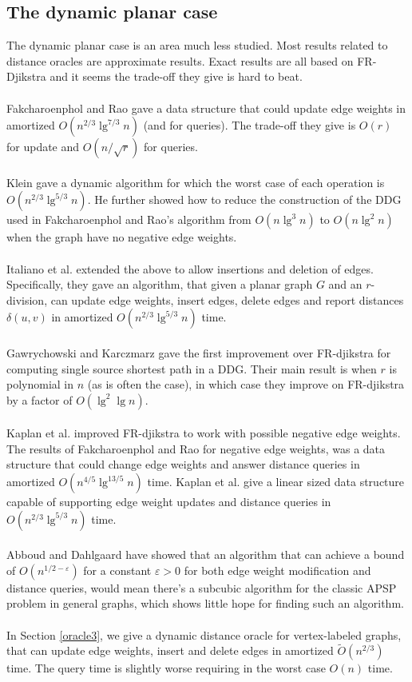 \subsection{The dynamic planar case}
The dynamic planar case is an area much less studied. Most results related to distance
oracles are approximate results. Exact results are all based on FR-Djikstra and it
seems the trade-off they give is hard to beat.\\
\\
Fakcharoenphol and Rao \cite{fakcharoenphol2006planar} gave a data structure that could
update edge weights in amortized $O(n^{2/3}\lg^{7/3} n)$ (and for queries). The trade-off
they give is $O(r)$ for update and $O(n/\sqrt{r})$ for queries. \\
\\
Klein \cite{klein2005multiple} gave a dynamic algorithm for which the worst case of each
operation is $O(n^{2/3}\lg^{5/3} n)$. He further showed how to reduce the construction of
the DDG used in Fakcharoenphol and Rao's algorithm from $O(n\lg^3 n)$ to $O(n\lg^2 n)$
when the graph have no negative edge weights. \\
\\
Italiano et al. \cite{italiano2011improved} extended the above to allow insertions and
deletion of edges. Specifically, they gave an algorithm, that given a planar graph $G$
and an $r$-division,
can update edge weights, insert edges, delete edges and report distances $\delta(u,v)$ in amortized $O(n^{2/3}\lg^{5/3}
n)$ time. \\
\\
Gawrychowski and Karczmarz \cite{gawrychowski2016improved} gave the first improvement
over FR-djikstra for computing single source shortest path in a DDG. Their main result is when $r$ is polynomial in $n$ (as is often the
case), in which case they improve on FR-djikstra by a factor of $O(\lg^2 \lg n)$. \\
\\
Kaplan et al. \cite{kaplan2012submatrix} improved FR-djikstra to work with possible
negative edge weights. The results of Fakcharoenphol and Rao for negative edge weights,
was a data structure that could change edge weights and answer distance queries in
amortized $O(n^{4/5}\lg^{13/5} n)$ time. Kaplan et al. give a linear sized data structure capable of supporting edge
weight updates and distance queries in $O(n^{2/3}\lg^{5/3} n)$ time. \\
\\
Abboud and Dahlgaard \cite{abboud2016popular} have showed that an algorithm that can
achieve a bound of $O(n^{1/2-\varepsilon})$ for a constant $\varepsilon>0$ for both edge
weight modification and distance queries, would mean
there's a subcubic algorithm for the classic APSP problem in general graphs, which shows
little hope for finding such an algorithm. \\
\\
In Section \ref{oracle3}, we give a dynamic distance oracle for vertex-labeled graphs,
that can update edge weights, insert and delete edges in amortized $\tilde{O}(n^{2/3})$
time. The query time is slightly worse requiring in the worst case $O(n)$ time.
